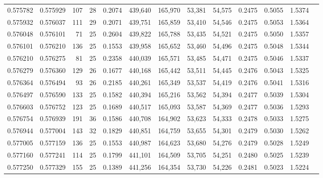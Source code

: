 \begin{tabular}{rrrrrrrrrrrrr}
0.575782 & 0.575929 &   107 &  28 &                                     0.2074 & 439,640 & 165,970 &  53,381 &  54,575 & 0.2475 & 0.5055 & 1.5374 \\
0.575932 & 0.576037 &   111 &  29 &                                     0.2071 & 439,751 & 165,859 &  53,410 &  54,546 & 0.2475 & 0.5053 & 1.5364 \\
0.576048 & 0.576101 &    71 &  25 &                                     0.2604 & 439,822 & 165,788 &  53,435 &  54,521 & 0.2475 & 0.5050 & 1.5357 \\
0.576101 & 0.576210 &   136 &  25 &                                     0.1553 & 439,958 & 165,652 &  53,460 &  54,496 & 0.2475 & 0.5048 & 1.5344 \\
0.576210 & 0.576275 &    81 &  25 &                                     0.2358 & 440,039 & 165,571 &  53,485 &  54,471 & 0.2475 & 0.5046 & 1.5337 \\
0.576279 & 0.576360 &   129 &  26 &                                     0.1677 & 440,168 & 165,442 &  53,511 &  54,445 & 0.2476 & 0.5043 & 1.5325 \\
0.576364 & 0.576494 &    93 &  26 &                                     0.2185 & 440,261 & 165,349 &  53,537 &  54,419 & 0.2476 & 0.5041 & 1.5316 \\
0.576497 & 0.576590 &   133 &  25 &                                     0.1582 & 440,394 & 165,216 &  53,562 &  54,394 & 0.2477 & 0.5039 & 1.5304 \\
0.576603 & 0.576752 &   123 &  25 &                                     0.1689 & 440,517 & 165,093 &  53,587 &  54,369 & 0.2477 & 0.5036 & 1.5293 \\
0.576754 & 0.576939 &   191 &  36 &                                     0.1586 & 440,708 & 164,902 &  53,623 &  54,333 & 0.2478 & 0.5033 & 1.5275 \\
0.576944 & 0.577004 &   143 &  32 &                                     0.1829 & 440,851 & 164,759 &  53,655 &  54,301 & 0.2479 & 0.5030 & 1.5262 \\
0.577005 & 0.577159 &   136 &  25 &                                     0.1553 & 440,987 & 164,623 &  53,680 &  54,276 & 0.2479 & 0.5028 & 1.5249 \\
0.577160 & 0.577241 &   114 &  25 &                                     0.1799 & 441,101 & 164,509 &  53,705 &  54,251 & 0.2480 & 0.5025 & 1.5239 \\
0.577250 & 0.577329 &   155 &  25 &                                     0.1389 & 441,256 & 164,354 &  53,730 &  54,226 & 0.2481 & 0.5023 & 1.5224 \\

\end{tabular}
